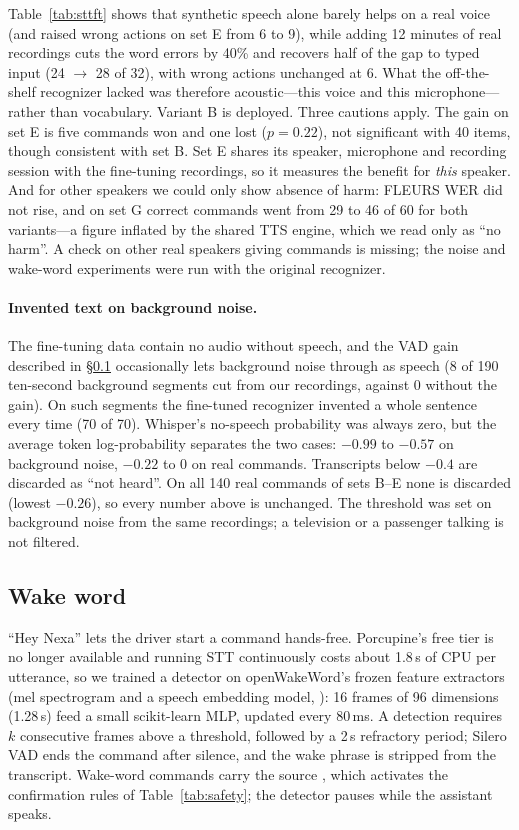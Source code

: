 Table~\ref{tab:sttft} shows that synthetic speech alone barely helps on a real voice (and raised wrong actions on set E from
6 to 9), while adding 12 minutes of real recordings cuts the word errors by 40\% and recovers half of the gap to typed input
(24 $\rightarrow$ 28 of 32), with wrong actions unchanged at 6. What the off-the-shelf recognizer lacked was therefore
acoustic---this voice and this microphone---rather than vocabulary. Variant B is deployed. Three cautions apply. The gain on
set E is five commands won and one lost ($p=0.22$), not significant with 40 items, though consistent with set B. Set E shares
its speaker, microphone and recording session with the fine-tuning recordings, so it measures the benefit for \emph{this}
speaker. And for other speakers we could only show absence of harm: FLEURS WER did not rise, and on set G correct commands
went from 29 to 46 of 60 for both variants---a figure inflated by the shared TTS engine, which we read only as ``no harm''. A
check on other real speakers giving commands is missing; the noise and wake-word experiments were run with the original
recognizer.

\paragraph{Invented text on background noise.} The fine-tuning data contain no audio without speech, and the VAD gain
described in \S\ref{sec:wake} occasionally lets background noise through as speech (8 of 190 ten-second background
segments cut from our recordings, against 0 without the gain). On such segments the fine-tuned recognizer invented a whole
sentence every time (70 of 70). Whisper's no-speech probability was always zero, but the average token log-probability
separates the two cases: $-0.99$ to $-0.57$ on background noise, $-0.22$ to $0$ on real commands. Transcripts below $-0.4$
are discarded as ``not heard''. On all 140 real commands of sets B--E none is discarded (lowest $-0.26$), so every number
above is unchanged. The threshold was set on background noise from the same recordings; a television or a passenger talking
is not filtered.

\subsection{Wake word}
\label{sec:wake}

``Hey Nexa'' lets the driver start a command hands-free. Porcupine's free tier is no longer available and running STT
continuously costs about 1.8\,s of CPU per utterance, so we trained a detector on openWakeWord's
\citep{scripka2023openwakeword} frozen feature extractors (mel spectrogram and a speech embedding model,
\citealp{lin2020kws}): 16 frames of 96 dimensions (1.28\,s) feed a small scikit-learn MLP, updated every 80\,ms. A detection
requires $k$ consecutive frames above a threshold, followed by a 2\,s refractory period; Silero VAD \citep{silero2024vad} ends the
command after silence, and the wake phrase is stripped from the transcript. Wake-word commands carry the source
, which activates the confirmation rules of Table~\ref{tab:safety}; the detector pauses while the assistant
speaks.

